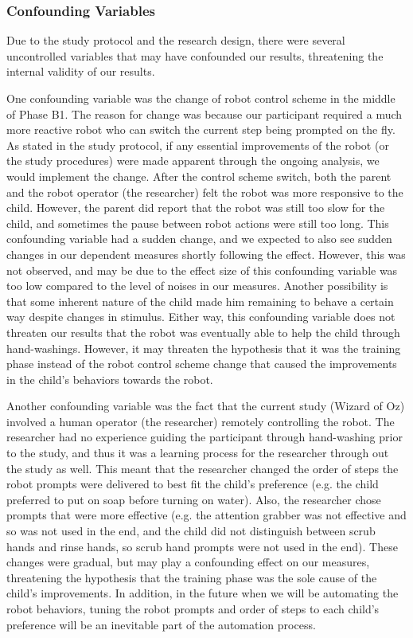 \documentclass{ut-thesis}
\begin{document}
\subsubsection{Confounding Variables}
Due to the study protocol and the research design, there were several uncontrolled variables that may have confounded our results, threatening the internal validity of our results.

One confounding variable was the change of robot control scheme in the middle of Phase B1.  The reason for change was because our participant required a much more reactive robot who can switch the current step being prompted on the fly.  As stated in the study protocol, if any essential improvements of the robot (or the study procedures) were made apparent through the ongoing analysis, we would implement the change.  After the control scheme switch, both the parent and the robot operator (the researcher) felt the robot was more responsive to the child.  However, the parent did report that the robot was still too slow for the child, and sometimes the pause between robot actions were still too long.  This confounding variable had a sudden change, and we expected to also see sudden changes in our dependent measures shortly following the effect.  However, this was not observed, and may be due to the effect size of this confounding variable was too low compared to the level of noises in our measures.  Another possibility is that some inherent nature of the child made him remaining to behave a certain way despite changes in stimulus.  Either way, this confounding variable does not threaten our results that the robot was eventually able to help the child through hand-washings.  However, it may threaten the hypothesis that it was the training phase instead of the robot control scheme change that caused the improvements in the child's behaviors towards the robot.

Another confounding variable was the fact that the current study (Wizard of Oz) involved a human operator (the researcher) remotely controlling the robot.  The researcher had no experience guiding the participant through hand-washing prior to the study, and thus it was a learning process for the researcher through out the study as well.  This meant that the researcher changed the order of steps the robot prompts were delivered to best fit the child's preference (e.g. the child preferred to put on soap before turning on water).  Also, the researcher chose prompts that were more effective (e.g. the attention grabber was not effective and so was not used in the end, and the child did not distinguish between scrub hands and rinse hands, so scrub hand prompts were not used in the end).  These changes were gradual, but may play a confounding effect on our measures, threatening the hypothesis that the training phase was the sole cause of the child's improvements.  In addition, in the future when we will be automating the robot behaviors, tuning the robot prompts and order of steps to each child's preference will be an inevitable part of the automation process.
\end{document}
